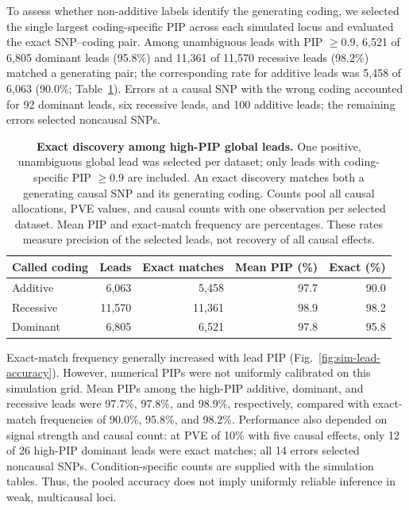 \documentclass[12pt]{article}
\begin{document}
To assess whether non-additive labels identify the generating
coding, we selected the single largest coding-specific PIP across each
simulated locus and evaluated the exact SNP--coding pair. Among
unambiguous leads with PIP $\geq 0.9$, 6,521 of 6,805 dominant leads
(95.8\%) and 11,361 of 11,570 recessive leads (98.2\%) matched a generating
pair; the corresponding rate for additive leads was 5,458 of 6,063
(90.0\%; Table~\ref{tab:sim-lead-accuracy}). Errors at a causal SNP with
the wrong coding accounted for 92 dominant leads, six recessive leads,
and 100 additive leads; the remaining errors selected noncausal SNPs.

\begin{table}[t]
\centering
\small
\caption{\textbf{Exact discovery among high-PIP global leads.} One positive, unambiguous global lead was selected per dataset;
only leads with coding-specific PIP $\geq 0.9$ are included. An exact
discovery matches both a generating causal SNP and its generating coding.
Counts pool all causal allocations, PVE values, and causal counts with
one observation per selected dataset. Mean PIP and exact-match frequency
are percentages. These rates measure precision of the selected leads,
not recovery of all causal effects.}
\label{tab:sim-lead-accuracy}
\begin{tabular}{lrrrr}
\hline
Called coding & Leads & Exact matches & Mean PIP (\%) & Exact (\%) \\
\hline
Additive & 6,063 & 5,458 & 97.7 & 90.0 \\
Recessive & 11,570 & 11,361 & 98.9 & 98.2 \\
Dominant & 6,805 & 6,521 & 97.8 & 95.8 \\
\hline
\end{tabular}
\end{table}

Exact-match frequency generally increased with lead PIP
(Fig.~\ref{fig:sim-lead-accuracy}). However, numerical PIPs were not
uniformly calibrated on this simulation grid. Mean PIPs among the
high-PIP additive, dominant, and recessive leads were 97.7\%, 97.8\%,
and 98.9\%, respectively, compared with exact-match frequencies of
90.0\%, 95.8\%, and 98.2\%. Performance also depended on signal strength
and causal count: at PVE of 10\% with five causal effects, only 12 of
26 high-PIP dominant leads were exact matches; all 14 errors selected
noncausal SNPs. Condition-specific counts are supplied with the
simulation tables. Thus, the pooled accuracy does not imply uniformly
reliable inference in weak, multicausal loci.
\end{document}
